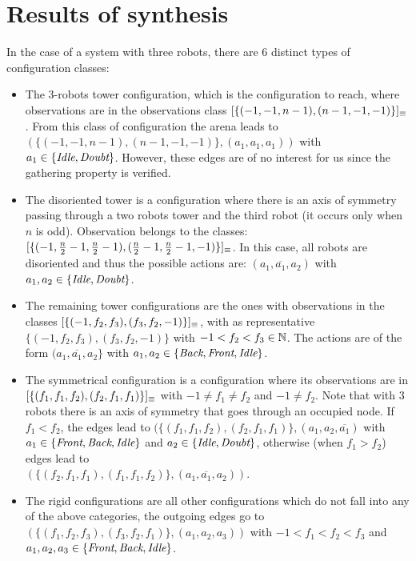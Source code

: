		\section {Results of synthesis}
In the case of a system with three robots, there are $6$ distinct types of configuration classes:   
\begin{itemize}
	\item The 3-robots tower configuration, which is the configuration to reach, 
	where observations are in the observations class
	$[\{(-1, -1, n-1), (n-1, -1, -1)\}]_{\equiv}$. From this class of configuration  
	the arena leads to $(\{(-1, -1, n-1), (n-1, -1, -1)\}, (a_1, a_1, a_1))$ 
	with $a_1 \in\{\textit{Idle}, \textit{Doubt}\}$. 
	However, these edges are of no interest for us since the gathering property is verified.
	\item The disoriented tower is a configuration where there is an axis of symmetry 
	passing through a two robots tower and the third robot (it occurs only when $n$ is odd).
	Observation belongs to the classes:  
	$[\{(-1, \frac{n}{2}-1, \frac{n}{2}-1), (\frac{n}{2}-1, \frac{n}{2}-1, -1)\}]_{\equiv}$.  
	In this case, all robots are disoriented and thus the possible actions are:  
	 $(a_1, \overline{a_1}, a_2)$ with $a_1, a_2\in\{\textit{Idle}, \textit{Doubt}\}$.
	\item The remaining tower configurations are the ones with observations in the classes $[\{(-1, f_2, f_3), (f_3, f_2, -1)\}]_{\equiv}$, 
	with as representative $\{(-1, f_2, f_3), (f_3, f_2, -1)\}$ with $-1<f_2< f_3 \in \mathbb{N}$.
	The actions are of the form $(a_1, \overline{a_1}, a_2\}$ with $a_1, a_2\in\{\textit{Back}, \textit{Front}, \textit{Idle}\}$.
	\item The symmetrical configuration is a configuration where its observations are 
	in $[\{(f_1, f_1, f_2), (f_2, f_1, f_1)\}]_{\equiv}$ with $-1\neq f_1 \neq f_2$ and $-1 \neq f_{2}$.
	 Note that with $3$ robots there is an axis of symmetry that goes through an occupied node.
	 If $f_1 < f_2$, the edges lead to $(\{(f_1, f_1, f_2), (f_2, f_1, f_1)\}, (a_1, a_2, \overline{a_1})$ 
	 with $a_1\in\{\textit{Front}, \textit{Back}, \textit{Idle}\}$ and $a_2\in\{\textit{Idle}, \textit{Doubt}\}$, 
	otherwise (when $f_1>f_2$) edges lead to \\$(\{(f_2, f_1, f_1), (f_1, f_1, f_2)\}, (a_1, \overline{a_1}, a_2))$. 
	\item The rigid configurations are all other configurations which do not fall into any of the above categories, 
	the outgoing edges go to $(\{(f_1, f_2, f_3), (f_3, f_2, f_1)\}, (a_1, a_2, a_3))$ with $-1 < f_1 < f_2 < f_3$
	and $a_1, a_2, a_3\in \{\textit{Front}, \textit{Back}, \textit{Idle}\}$. 
\end{itemize}

